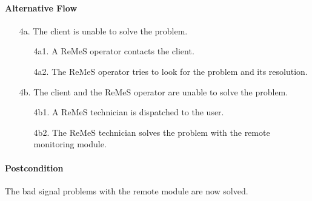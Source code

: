 \paragraph{Alternative Flow}
\begin{enumerate}
	\item[4a.] The client is unable to solve the problem.
	\begin{enumerate}
		\item[4a1.] A ReMeS operator contacts the client.
		\item[4a2.] The ReMeS operator tries to look for the problem and its resolution.
	\end{enumerate}
	\item[4b.] The client and the ReMeS operator are unable to solve the problem.
	\begin{enumerate}
		\item[4b1.] A ReMeS technician is dispatched to the user.
		\item[4b2.] The ReMeS technician solves the problem with the remote monitoring module.
	\end{enumerate}
\end{enumerate}


\paragraph{Postcondition}
The bad signal problems with the remote module are now solved.
